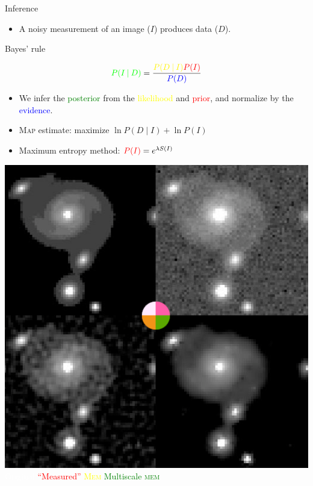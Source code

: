 \documentclass[14pt,c]{beamer}
\begin{document}
\begin{frame}{Inference}
  \begin{itemize}
    \item A noisy measurement of an image ($I$) produces data ($D$).
  \end{itemize}
  \centerline{Bayes' rule}
  \[
    \textcolor{green}{P(I \mathbin{|} D)}
    = \frac{\textcolor{yellow}{P(D \mathbin{|} I)}
      \textcolor{red}{%
    P(I)}}{\textcolor{blue}{P(D)}}
  \]
  \begin{itemize}
    \item We infer the \textcolor{green}{posterior} from the
      \textcolor{yellow}{likelihood} and \textcolor{red}{prior}, and
      normalize by the \textcolor{blue}{evidence}.
    \item \textsc{Map} estimate: maximize $\ln P(D \mathbin{|} I) + \ln
      P(I)$
    \item Maximum entropy method: $\textcolor{red}{P(I)} =
      e^{\lambda S(I)}$
  \end{itemize}
\end{frame}

\begin{frame}
  \centering
  \includegraphics[width=0.625\framewidth]{astro-maxent}
  \\
  \textcolor{white}{Original}\;
  \textcolor{red}{``Measured''}\;
  \textcolor{yellow}{\textsc{Mem}}\;
  \textcolor{green}{Multiscale \textsc{mem}}

  \scriptsize
  \vspace{\baselineskip}
\end{frame}
\end{document}
